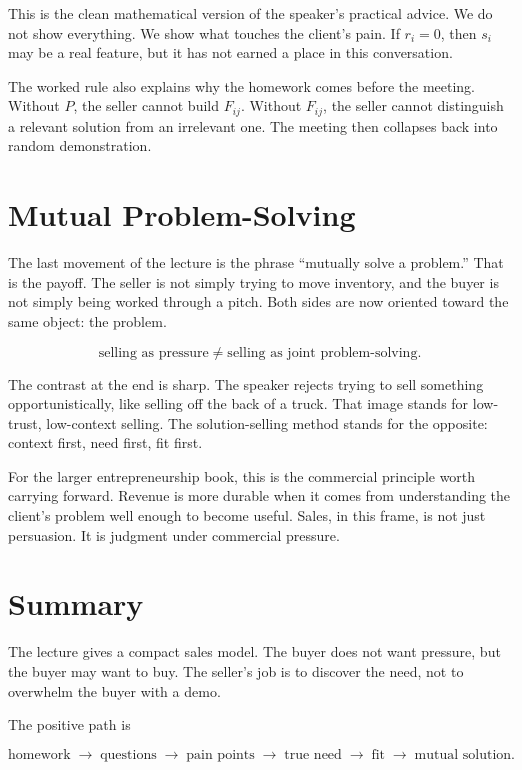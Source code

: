 This is the clean mathematical version of the speaker's practical advice. We do not show everything. We show what touches the client's pain. If \(r_i=0\), then \(s_i\) may be a real feature, but it has not earned a place in this conversation.

The worked rule also explains why the homework comes before the meeting. Without \(P\), the seller cannot build \(F_{ij}\). Without \(F_{ij}\), the seller cannot distinguish a relevant solution from an irrelevant one. The meeting then collapses back into random demonstration.

\section{Mutual Problem-Solving}

The last movement of the lecture is the phrase ``mutually solve a problem.'' That is the payoff. The seller is not simply trying to move inventory, and the buyer is not simply being worked through a pitch. Both sides are now oriented toward the same object: the problem.

\begin{equation}
\text{selling as pressure}
\neq
\text{selling as joint problem-solving}.
\end{equation}

The contrast at the end is sharp. The speaker rejects trying to sell something opportunistically, like selling off the back of a truck. That image stands for low-trust, low-context selling. The solution-selling method stands for the opposite: context first, need first, fit first.

For the larger entrepreneurship book, this is the commercial principle worth carrying forward. Revenue is more durable when it comes from understanding the client's problem well enough to become useful. Sales, in this frame, is not just persuasion. It is judgment under commercial pressure.

\section{Summary}

The lecture gives a compact sales model. The buyer does not want pressure, but the buyer may want to buy. The seller's job is to discover the need, not to overwhelm the buyer with a demo.

The positive path is

\begin{equation}
\text{homework}
\;\longrightarrow\;
\text{questions}
\;\longrightarrow\;
\text{pain points}
\;\longrightarrow\;
\text{true need}
\;\longrightarrow\;
\text{fit}
\;\longrightarrow\;
\text{mutual solution}.
\end{equation}


